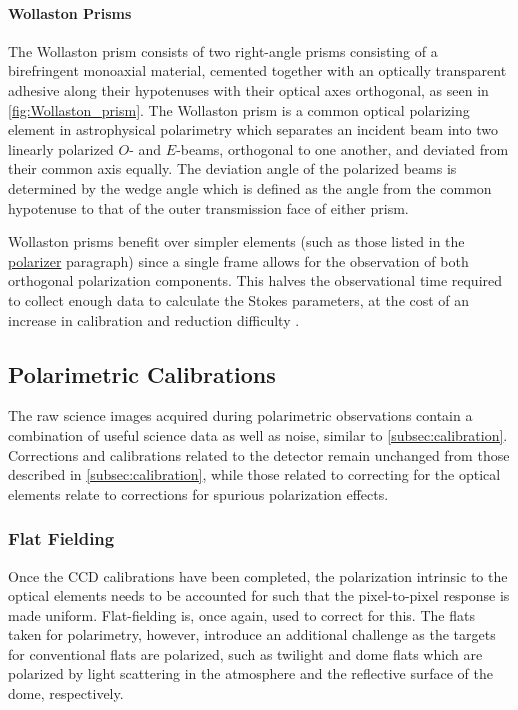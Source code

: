 \paragraph{Wollaston Prisms}
The Wollaston prism consists of two right-angle prisms consisting of a birefringent monoaxial material, cemented together with an optically transparent adhesive along their hypotenuses with their optical axes orthogonal, as seen in \autoref{fig:Wollaston_prism}. The Wollaston prism is a common optical polarizing element in astrophysical polarimetry which separates an incident beam into two linearly polarized $O$- and $E$-beams, orthogonal to one another, and deviated from their common axis equally. The deviation angle of the polarized beams is determined by the wedge angle which is defined as the angle from the common hypotenuse to that of the outer transmission face of either prism.

Wollaston prisms benefit over simpler elements (such as those listed in the \hyperref[par:polarizer]{polarizer} paragraph) since a single frame allows for the observation of both orthogonal polarization components. This halves the observational time required to collect enough data to calculate the Stokes parameters, at the cost of an increase in calibration and reduction difficulty \citep{wollaston}.

\subsection{Polarimetric Calibrations} \label{subsec:pol_cal}

The raw science images acquired during polarimetric observations contain a combination of useful science data as well as noise, similar to \autoref{subsec:calibration}. Corrections and calibrations related to the detector remain unchanged from those described in \autoref{subsec:calibration}, while those related to correcting for the optical elements relate to corrections for spurious polarization effects.

\subsubsection{Flat Fielding} \label{subsubsec:pol_flat}

Once the \gls{CCD} calibrations have been completed, the polarization intrinsic to the optical elements needs to be accounted for such that the pixel-to-pixel response is made uniform. Flat-fielding is, once again, used to correct for this. The flats taken for polarimetry, however, introduce an additional challenge as the targets for conventional flats are polarized, such as twilight and dome flats which are polarized by light scattering in the atmosphere and the reflective surface of the dome, respectively.

